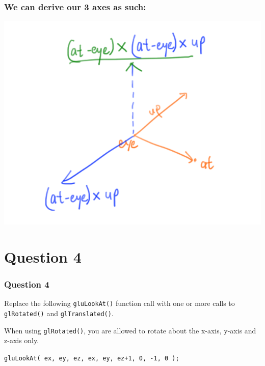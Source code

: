 \documentclass{beamer}
\begin{document}
\begin{frame}
    \frametitle{We can derive our 3 axes as such:}

    \begin{center}
        \includegraphics[scale=1.3]{q3.png}
    \end{center}

\end{frame}

\section{Question 4}

\begin{frame}
    \frametitle{Question 4}
    Replace the following \texttt{gluLookAt()} function call with one or more calls to 
    \texttt{glRotated()} and \texttt{glTranslated()}.

    When using \texttt{glRotated()}, you are allowed to rotate about the x-axis, 
    y-axis and z-axis only.

    \vspace{1em}

    \begin{tcolorbox}[colback=violet!5!white]
        \centering
        \texttt{gluLookAt( ex, ey, ez, ex, ey, ez+1, 0, -1, 0 );}
    \end{tcolorbox}
\end{frame}
\end{document}
